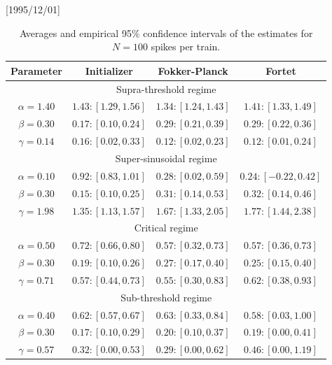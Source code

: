 \NeedsTeXFormat{LaTeX2e}[1995/12/01] \documentclass[10pt]{bmc_article}
\newenvironment{bmcformat}{\begin{raggedright}\baselineskip20pt\sloppy\setboolean{publ}{false}}{\end{raggedright}\baselineskip20pt\sloppy}
\begin{document}
\begin{bmcformat}
\begin{table}
\begin{center}
{\begin{tabular}{|c|ccc|} 
Parameter
& Initializer
& Fokker-Planck
& Fortet
\\ \hline
\multicolumn{4}{|c|}{Supra-threshold regime} \\[1mm]
$\alpha=1.40$
& $1.43 : [1.29, 1.56]$
& $1.34 : [1.24, 1.43]$
& $1.41 : [1.33, 1.49]$
\\
$\beta=0.30$
& $0.17 : [0.10, 0.24]$
& $0.29 : [0.21, 0.39]$
& $0.29 : [0.22, 0.36]$
\\
$\gamma=0.14$
& $0.16 : [0.02, 0.33]$
& $0.12 : [0.02, 0.23]$
& $0.12 : [0.01, 0.24]$
\\
\hline \hline
\multicolumn{4}{|c|}{Super-sinusoidal regime} \\[1mm]
$\alpha=0.10$
& $0.92 : [0.83, 1.01]$
& $0.28 : [0.02, 0.59]$
& $0.24 : [-0.22, 0.42]$
\\
$\beta=0.30$
& $0.15 : [0.10, 0.25]$
& $0.31 : [0.14, 0.53]$
& $0.32 : [0.14, 0.46]$
\\
$\gamma=1.98$
& $1.35 : [1.13, 1.57]$
& $1.67 : [1.33, 2.05]$
& $1.77 : [1.44, 2.38]$
\\
\hline \hline
\multicolumn{4}{|c|}{Critical regime} \\[1mm]
$\alpha=0.50$
& $0.72 : [0.66, 0.80]$
& $0.57 : [0.32, 0.73]$
& $0.57 : [0.36, 0.73]$
\\
$\beta=0.30$
& $0.19 : [0.10, 0.26]$
& $0.27 : [0.17, 0.40]$
& $0.25 : [0.15, 0.40]$
\\
$\gamma=0.71$
& $0.57 : [0.44, 0.73]$
& $0.55 : [0.30, 0.83]$
& $0.62 : [0.38, 0.93]$
\\
\hline \hline
\multicolumn{4}{|c|}{Sub-threshold regime} \\[1mm]
$\alpha=0.40$
& $0.62 : [0.57, 0.67]$
& $0.63 : [0.33, 0.84]$
& $0.58 : [0.03, 1.00]$
\\
$\beta=0.30$
& $0.17 : [0.10, 0.29]$
& $0.20 : [0.10, 0.37]$
& $0.19 : [0.00, 0.41]$
\\
$\gamma=0.57$
& $0.32 : [0.00, 0.53]$
& $0.29 : [0.00, 0.62]$
& $0.46 : [0.00, 1.19]$
\\
\hline
 \end{tabular}}\\
\end{center}
\caption{Averages and empirical 95\% confidence intervals of the estimates for
$N=100$ spikes per train.}
\label{tab:est_quantiles_100}
\end{table}
\begin{table}


\end{table}
\end{bmcformat}
\end{document}
